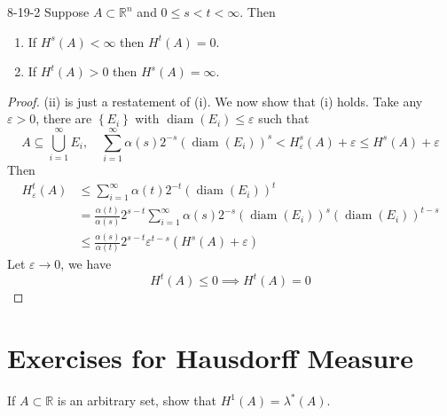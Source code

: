 \documentclass[../main.tex]{subfiles}
\begin{document}
\begin{theorem}{}{8-19-2}
Suppose $A \subset \mathbb{R}^n$ and $0 \le s < t < \infty$. Then
\begin{enumerate}
\item[(i)] If $H^s(A) < \infty$ then $H^t(A) = 0$.
\item[(ii)] If $H^t(A) > 0$ then $H^s(A) = \infty$.
\end{enumerate}
\end{theorem}
\begin{proof}
    (ii) is just a restatement of (i). We now show that (i) holds.
    Take any \(   \varepsilon > 0  \), there are \(  \left\{ E_{i} \right\}  \) with \(  \operatorname{diam}\left( E_{i} \right)\le  \varepsilon    \) such that \[
    A\subseteq \bigcup _{i= 1}^{\infty}E_{i},\quad  \sum _{i = 1}^{\infty}\alpha \left( s \right) 2^{-s} \left( \operatorname{diam}\left( E_{i} \right)  \right)^{s}< H_{ \varepsilon }^{s}\left( A \right)+  \varepsilon  \le H^{s}\left( A \right)+  \varepsilon    
    \]Then \[
    \begin{aligned}
    H_{ \varepsilon }^{t}\left( A \right)&\le \sum _{i = 1}^{\infty}\alpha \left( t \right)2^{-t}\left( \operatorname{diam}\left( E_{i} \right)  \right)^{t}\\ 
     &= \frac{\alpha \left( t \right)  }{\alpha \left( s \right)  }2^{s-t}  \sum _{i = 1}^{\infty}\alpha \left( s \right)2^{-s}    \left( \operatorname{diam}\left( E_{i} \right)  \right)^{s} \left( \operatorname{diam}\left( E_{i} \right)  \right)^{t-s}\\ 
      &\le \frac{ \alpha \left( s \right)  }{ \alpha \left( t \right)  } 2^{s-t}  \varepsilon ^{t-s}   \left( H^{s}\left( A \right)+  \varepsilon   \right) 
    \end{aligned}
    \]   Let \(   \varepsilon \to 0  \), we have \[
    H^{t}\left( A \right)\le 0 \implies H^{t}\left( A \right)= 0  
    \] 
\end{proof}

\section*{Exercises for Hausdorff Measure}

\begin{exercise}{}{}
    If $A \subset \mathbb{R}$ is an arbitrary set, show that $H^1(A) = \lambda^*(A)$.
\end{exercise}
\end{document}
